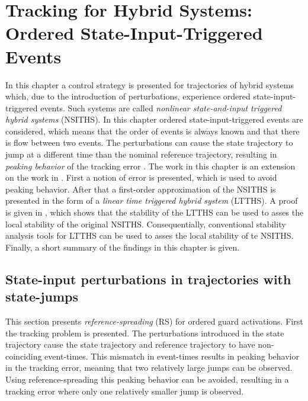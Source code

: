 \documentclass[../DC2017114Bouma.tex]{subfiles}
\begin{document}
\graphicspath{{03_Contribution/img/}}
\renewcommand{\chaptermark}[1]{\markboth{\thechapter.\ #1}{}}
\renewcommand{\sectionmark}[1]{\markright{#1}{}}

\pagestyle{fancyreport}
\cleartooddpage
\pagestyle{fancyreport}
\chapter{Tracking for Hybrid Systems: Ordered State-Input-Triggered Events}\label{ch:order}
In this chapter a control strategy is presented for trajectories of hybrid systems which, due to the introduction of perturbations, experience ordered state-input-triggered events. Such systems are called \textit{nonlinear state-and-input triggered hybrid systems} (NSITHS). In this chapter ordered state-input-triggered events are considered, which means that the order of events is always known and that there is flow between two events. The perturbations can cause the state trajectory to jump at a different time than the nominal reference trajectory, resulting in \textit{peaking behavior} of the tracking error \cite{Menini2001,Biemond2013}. The work in this chapter is an extension on the work in \cite{Rijnen2017}. First a notion of error is presented, which is used to avoid peaking behavior. After that a first-order approximation of the NSITHS is presented in the form of a \textit{linear time triggered hybrid system} (LTTHS). A proof is given in \cite{Rijnen2017}, which shows that the stability of the LTTHS can be used to asses the local stability of the original NSITHS. Consequentially, conventional stability analysis tools for LTTHS can be used to asses the local stability of te NSITHS. Finally, a short summary of the findings in this chapter is given.
%
%

\section{State-input perturbations in trajectories with state-jumps}
This section presents \textit{reference-spreading} (RS) for ordered guard activations. First the tracking problem is presented. The perturbations introduced in the state trajectory cause the state trajectory and reference trajectory to have non-coinciding event-times. This mismatch in event-times results in peaking behavior in the tracking error, meaning that two relatively large jumps can be observed. Using reference-spreading this peaking behavior can be avoided, resulting in a tracking error where only one relatively smaller jump is observed.
%
\end{document}
